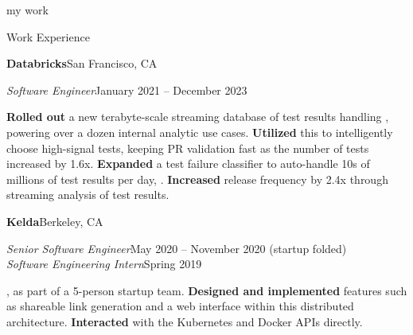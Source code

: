 \begin{minipage}[t]{0.305\textwidth}








\end{minipage}
\hfill\vrule\hfill{}
\begin{minipage}[t]{0.665\textwidth}
  {\Huge my work \phantom{me}}

  \vspace{10pt}

  {\sectionfont Work Experience}

  \vspace{5pt}
  \textbf{Databricks}\quad{}\hfill San Francisco, CA
  \begin{adjustwidth}{10pt}{}
    \emph{Software Engineer}\hfill January 2021 -- December 2023

    \textbf{Rolled out} a new terabyte-scale streaming database of test results handling , powering over a dozen internal analytic use cases.
    \textbf{Utilized} this to intelligently choose high-signal tests, keeping PR validation fast as the number of tests increased by 1.6x.
    \textbf{Expanded} a test failure classifier to auto-handle 10s of millions of test results per day, .
    \textbf{Increased} release frequency by 2.4x through streaming analysis of test results.
  \end{adjustwidth}

  \vspace{5pt}
  \textbf{Kelda}\quad{}\hfill Berkeley, CA
  \begin{adjustwidth}{10pt}{}
    \emph{Senior Software Engineer}\hfill May 2020 -- November 2020 (startup folded)\\
    \emph{Software Engineering Intern}\hfill Spring 2019

    , as part of a 5-person startup team.
    \textbf{Designed and implemented} features such as shareable link generation and a web interface within this distributed architecture.
    \textbf{Interacted} with the Kubernetes and Docker APIs directly.
  \end{adjustwidth}


\end{minipage}
